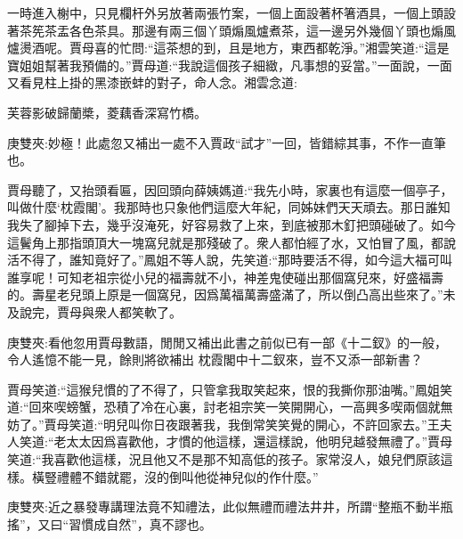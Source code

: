 \begin{parag}
    一時進入榭中，只見欄杆外另放著兩張竹案，一個上面設著杯箸酒具，一個上頭設著茶筅茶盂各色茶具。那邊有兩三個丫頭煽風爐煮茶，這一邊另外幾個丫頭也煽風爐燙酒呢。賈母喜的忙問:“這茶想的到，且是地方，東西都乾淨。”湘雲笑道:“這是寶姐姐幫著我預備的。”賈母道:“我說這個孩子細緻，凡事想的妥當。”一面說，一面又看見柱上掛的黑漆嵌蚌的對子，命人念。湘雲念道:
\end{parag}


\begin{poem}
    \begin{pl}芙蓉影破歸蘭槳，菱藕香深寫竹橋。\end{pl}
    \begin{note}庚雙夾:妙極！此處忽又補出一處不入賈政“試才”一回，皆錯綜其事，不作一直筆也。\end{note}
\end{poem}


\begin{parag}
    賈母聽了，又抬頭看匾，因回頭向薛姨媽道:“我先小時，家裏也有這麼一個亭子，叫做什麼‘枕霞閣’。我那時也只象他們這麼大年紀，同姊妹們天天頑去。那日誰知我失了腳掉下去，幾乎沒淹死，好容易救了上來，到底被那木釘把頭碰破了。如今這鬢角上那指頭頂大一塊窩兒就是那殘破了。衆人都怕經了水，又怕冒了風，都說活不得了，誰知竟好了。”鳳姐不等人說，先笑道:“那時要活不得，如今這大福可叫誰享呢！可知老祖宗從小兒的福壽就不小，神差鬼使碰出那個窩兒來，好盛福壽的。壽星老兒頭上原是一個窩兒，因爲萬福萬壽盛滿了，所以倒凸高出些來了。”未及說完，賈母與衆人都笑軟了。\begin{note}庚雙夾:看他忽用賈母數語，閒閒又補出此書之前似已有一部《十二釵》的一般，令人遙憶不能一見，餘則將欲補出 枕霞閣中十二釵來，豈不又添一部新書？\end{note}賈母笑道:“這猴兒慣的了不得了，只管拿我取笑起來，恨的我撕你那油嘴。”鳳姐笑道:“回來喫螃蟹，恐積了冷在心裏，討老祖宗笑一笑開開心，一高興多喫兩個就無妨了。”賈母笑道:“明兒叫你日夜跟著我，我倒常笑笑覺的開心，不許回家去。”王夫人笑道:“老太太因爲喜歡他，才慣的他這樣，還這樣說，他明兒越發無禮了。”賈母笑道:“我喜歡他這樣，況且他又不是那不知高低的孩子。家常沒人，娘兒們原該這樣。橫豎禮體不錯就罷，沒的倒叫他從神兒似的作什麼。”\begin{note}庚雙夾:近之暴發專講理法竟不知禮法，此似無禮而禮法井井，所謂“整瓶不動半瓶搖”，又曰“習慣成自然”，真不謬也。\end{note}
\end{parag}


